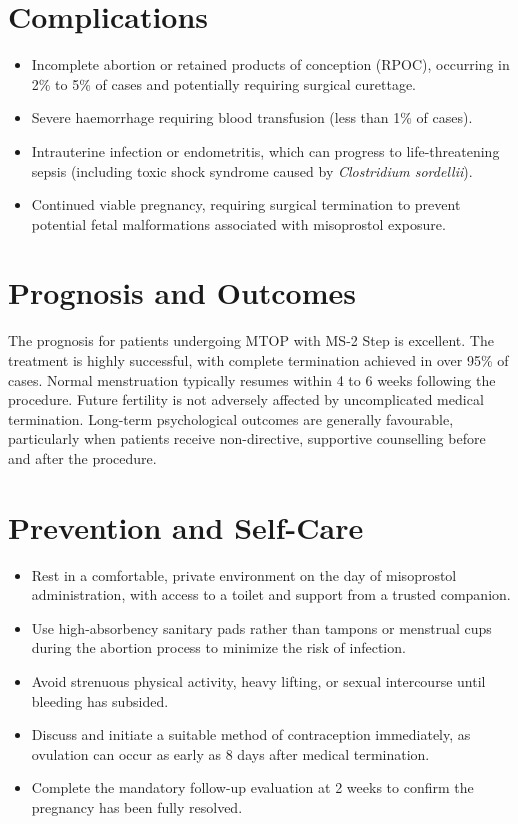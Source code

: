 \section*{Complications}
\begin{itemize}
    \item Incomplete abortion or retained products of conception (RPOC), occurring in 2\% to 5\% of cases and potentially requiring surgical curettage.
    \item Severe haemorrhage requiring blood transfusion (less than 1\% of cases).
    \item Intrauterine infection or endometritis, which can progress to life-threatening sepsis (including toxic shock syndrome caused by \textit{Clostridium sordellii}).
    \item Continued viable pregnancy, requiring surgical termination to prevent potential fetal malformations associated with misoprostol exposure.
\end{itemize}

\section*{Prognosis and Outcomes}
The prognosis for patients undergoing MTOP with MS-2 Step is excellent. The treatment is highly successful, with complete termination achieved in over 95\% of cases. Normal menstruation typically resumes within 4 to 6 weeks following the procedure. Future fertility is not adversely affected by uncomplicated medical termination. Long-term psychological outcomes are generally favourable, particularly when patients receive non-directive, supportive counselling before and after the procedure.

\section*{Prevention and Self-Care}
\begin{itemize}
    \item Rest in a comfortable, private environment on the day of misoprostol administration, with access to a toilet and support from a trusted companion.
    \item Use high-absorbency sanitary pads rather than tampons or menstrual cups during the abortion process to minimize the risk of infection.
    \item Avoid strenuous physical activity, heavy lifting, or sexual intercourse until bleeding has subsided.
    \item Discuss and initiate a suitable method of contraception immediately, as ovulation can occur as early as 8 days after medical termination.
    \item Complete the mandatory follow-up evaluation at 2 weeks to confirm the pregnancy has been fully resolved.
\end{itemize}

